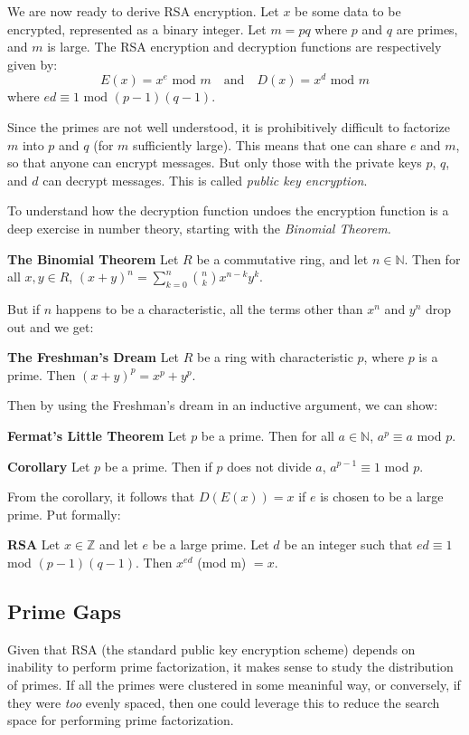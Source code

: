 \documentclass[12pt]{article}
\begin{document}
We are now ready to derive RSA encryption.
Let $x$ be some data to be encrypted, represented as a binary integer.
Let $m=pq$ where $p$ and $q$ are primes, and $m$ is large.
The RSA encryption and decryption functions are respectively given by:
$$E(x) = x^e \text{ mod $m$} \quad\text{and}\quad
D(x) = x^d \text{ mod $m$}$$
where $ed \equiv 1 \text{ mod } (p-1)(q-1)$.

Since the primes are not well understood, it is prohibitively difficult to 
factorize $m$ into $p$ and $q$ (for $m$ sufficiently large).
This means that one can share $e$ and $m$, so that anyone can encrypt messages.
But only those with the private keys
$p$, $q$, and $d$ can decrypt messages.
This is called {\it public key encryption}.

To understand how the decryption function undoes the encryption function is
a deep exercise in number theory, starting with the {\it Binomial Theorem.}

\textbf{The Binomial Theorem}
Let $R$ be a commutative ring, and let $n \in \mathbb{N}$.
Then for all $x,y \in R$, $(x+y)^n = \sum_{k=0}^{n} {n \choose k} x^{n-k}y^{k}$.

But if $n$ happens to be a characteristic, all the terms other than $x^n$ and
$y^n$ drop out and we get:

\textbf{The Freshman's Dream}
Let $R$ be a ring with characteristic $p$, where $p$ is a prime.
Then $(x+y)^p = x^p + y^p$.

Then by using the Freshman's dream in an inductive argument, we can show:

\textbf{Fermat's Little Theorem}
Let $p$ be a prime.
Then for all $a \in \mathbb{N}$, $a^p \equiv a$ mod $p$.

\textbf{Corollary}
Let $p$ be a prime.
Then if $p$ does not divide $a$, $a^{p-1} \equiv 1$ mod $p$.

From the corollary, it follows that $D(E(x)) = x$ if $e$ is chosen to be a 
large prime.
Put formally:

\textbf{RSA}
Let $x \in \mathbb{Z}$ and let $e$ be a large prime.
Let $d$ be an integer such that $ed \equiv 1$ mod $(p-1)(q-1)$.
Then $x^{ed}$ (mod m) $= x$.

\subsection*{Prime Gaps}

Given that RSA (the standard public key encryption scheme) depends on
inability to perform prime factorization, it makes sense to study the
distribution of primes.
If all the primes were clustered in some meaninful way, or conversely, if
they were {\it too} evenly spaced, then one could leverage this to reduce
the search space for performing prime factorization.
\end{document}
